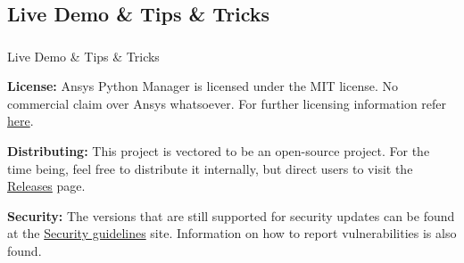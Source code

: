 \documentclass[t]{beamer}
\begin{document}
	\subsection{Live Demo \& Tips \& Tricks}
	\begin{frame}[fragile]
		\frametitle{}
		\vspace{60pt}
		\begin{center}
			Live Demo \& Tips \& Tricks
		\end{center}
		\vspace{70pt}
		\tiny
		\begin{noitemize}
			\setlength\itemsep{0pt} %
			\item \textbf{License:} Ansys Python Manager is licensed under the MIT license. No commercial claim over Ansys whatsoever. For further licensing information refer \href{https://github.com/ansys/python-installer-qt-gui?tab=License-1-ov-file#readme}{here}.
			\item \textbf{Distributing:} This project is vectored to be an open-source project. For the time being, feel free to distribute it internally, but direct users to visit the \href{https://github.com/ansys/python-installer-qt-gui/releases}{Releases} page.
			\item \textbf{Security:} The versions that are still supported for security updates can be found at the \href{https://github.com/ansys/python-installer-qt-gui/blob/main/SECURITY.md}{Security guidelines} site. Information on how to report vulnerabilities is also found.
		\end{noitemize}
	\end{frame}
	
	
	\lastframe{}
	
\end{document}

